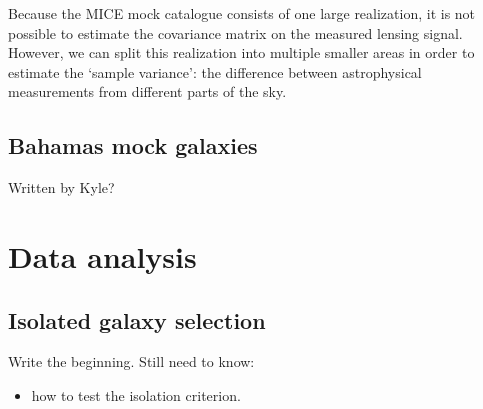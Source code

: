 \documentclass[fleqn,usenatbib]{mnras}
\begin{document}
Because the MICE mock catalogue consists of one large realization, it is not possible to estimate the covariance matrix on the measured lensing signal. However, we can split this realization into multiple smaller areas in order to estimate the `sample variance': the difference between astrophysical measurements from different parts of the sky.




\subsection{Bahamas mock galaxies}
\label{sec:bahamas_mocks}
Written by Kyle?

\section{Data analysis}
\label{sec:analysis}

\subsection{Isolated galaxy selection}
\label{sec:isolation}
Write the beginning.
Still need to know:
\begin{itemize}
	\item how to test the isolation criterion.
\end{itemize}
\end{document}

